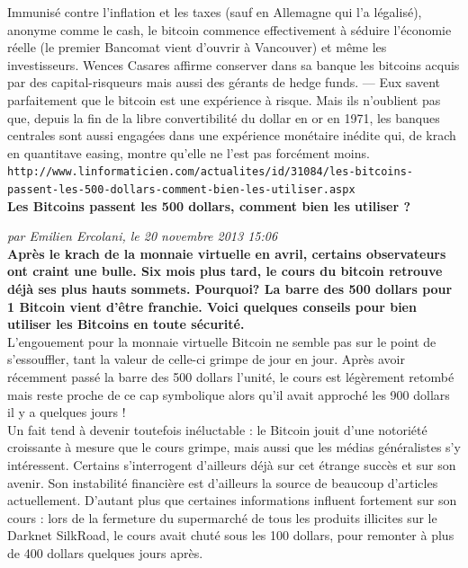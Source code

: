 \documentclass[11pt,twoside,a4paper]{article}
\begin{document}
Immunis{\'e} contre l'inflation et les taxes (sauf en Allemagne qui l'a l{\'e}galis{\'e}), anonyme comme le cash, le bitcoin commence effectivement {\`a} s{\'e}duire l'{\'e}conomie r{\'e}elle (le premier Bancomat vient d'ouvrir {\`a} Vancouver) et m{\^e}me les investisseurs. Wences Casares affirme conserver dans sa banque les bitcoins acquis par des capital-risqueurs mais aussi des g{\'e}rants de hedge funds. --- Eux savent parfaitement que le bitcoin est une exp{\'e}rience {\`a} risque. Mais ils n'oublient pas que, depuis la fin de la libre convertibilit{\'e} du dollar en or en 1971, les banques centrales sont aussi engag{\'e}es dans une exp{\'e}rience mon{\'e}taire in{\'e}dite qui, de krach en quantitave easing, montre qu'elle ne l'est pas forc{\'e}ment moins. ~\\


\texttt{http://www.linformaticien.com/actualites/id/31084/les-bitcoins-passent-les-500-dollars-comment-bien-les-utiliser.aspx}~\\

\textbf{Les Bitcoins passent les 500 dollars, comment bien les utiliser ?}

\emph{\small par Emilien Ercolani, le 20 novembre 2013 15:06}~\\

\textbf{Apr{\`e}s le krach de la monnaie virtuelle en avril, certains observateurs ont craint une bulle. Six mois plus tard, le cours du bitcoin retrouve d{\'e}j{\`a} ses plus hauts sommets. Pourquoi? La barre des 500 dollars pour 1 Bitcoin vient d'{\^e}tre franchie. Voici quelques conseils pour bien utiliser les Bitcoins en toute s{\'e}curit{\'e}. } ~\\

L'engouement pour la monnaie virtuelle Bitcoin ne semble pas sur le point de s'essouffler, tant la valeur de celle-ci grimpe de jour en jour. Apr{\`e}s avoir r{\'e}cemment pass{\'e} la barre des 500 dollars l'unit{\'e}, le cours est l{\'e}g{\`e}rement retomb{\'e} mais reste proche de ce cap symbolique alors qu'il avait approch{\'e} les 900 dollars il y a quelques jours ! ~\\ 

Un fait tend {\`a} devenir toutefois in{\'e}luctable : le Bitcoin jouit d'une notori{\'e}t{\'e} croissante {\`a} mesure que le cours grimpe, mais aussi que les m{\'e}dias g{\'e}n{\'e}ralistes s'y int{\'e}ressent. Certains s'interrogent d'ailleurs d{\'e}j{\`a} sur cet {\'e}trange succ{\`e}s et sur son avenir. Son instabilit{\'e} financi{\`e}re est d'ailleurs la source de beaucoup d'articles actuellement. D'autant plus que certaines informations influent fortement sur son cours : lors de la fermeture du supermarch{\'e} de tous les produits illicites sur le Darknet SilkRoad, le cours avait chut{\'e} sous les 100 dollars, pour remonter {\`a} plus de 400 dollars quelques jours apr{\`e}s. ~\\ 
\end{document}
